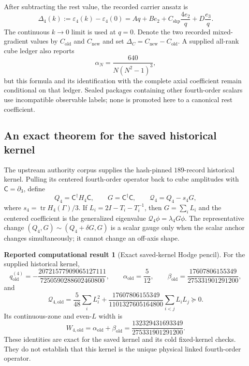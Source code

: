 \documentclass[11pt]{article}
\theoremstyle{plain}
\theoremstyle{definition}
\newtheorem{reported}[theorem]{Reported computational result}
\theoremstyle{remark}
\newcommand{\dg}{^{\dagger}}
\begin{document}
After subtracting the rest value, the recorded carrier ansatz is
\begin{equation}\label{eq:shapeansatz}
 \Delta_4(k):=\varepsilon_4(k)-\varepsilon_4(0)
 =Aq+Be_2+C_{\mathrm{shp}}\frac{4e_2}{q}
   +D\frac{e_3}{q}.
\end{equation}
The continuous $k\to0$ limit is used at $q=0$. Denote the two recorded
mixed-gradient values by $C_{\mathrm{old}}$ and $C_{\mathrm{new}}$ and set
$\Delta_C=C_{\mathrm{new}}-C_{\mathrm{old}}$. A supplied all-rank cube ledger
also reports
\begin{equation}\label{eq:alphaN}
 \alpha_N=\frac{640}{N(N^2-1)^3},
\end{equation}
but this formula and its identification with the complete axial coefficient
remain conditional on that ledger. Sealed packages containing other
fourth-order scalars use incompatible observable labels; none is promoted here
to a canonical rest coefficient.

\subsection{An exact theorem for the saved historical kernel}

The upstream authority corpus supplies the hash-pinned $189$-record historical
kernel. Pulling its centered fourth-order operator back to cube amplitudes with
$\mathsf C=\partial_3$, define
\[
 Q_4=\mathsf C\dg H_4\mathsf C,
 \qquad G=\mathsf C\dg\mathsf C,
 \qquad \mathcal Q_4=Q_4-s_4G,
\]
where $s_4=\operatorname{tr}H_4(\Gamma)/3$. If
$L_i=2I-T_i-T_i^{-1}$, then $G=\sum_iL_i$ and the centered coefficient is the
generalized eigenvalue $\mathcal Q_4\phi=\lambda_4G\phi$. The representative
change $(Q_4,G)\sim(Q_4+\delta G,G)$ is a scalar gauge only when the scalar
anchor changes simultaneously; it cannot change an off-axis shape.

\begin{reported}[Exact saved-kernel Hodge pencil]\label{rep:historical}
For the supplied historical kernel,
\[
 q_{\mathrm{old}}^{(4)}
 =-\frac{20721577909065127111}{7250590288602460800},\qquad
 \alpha_{\mathrm{old}}=\frac5{12},\qquad
 \beta_{\mathrm{old}}
 =\frac{17607806155349}{275331901291200},
\]
and
\begin{equation}\label{eq:oldhodge}
 \mathcal Q_{4,\mathrm{old}}
 =\frac5{48}\sum_iL_i^2
 +\frac{17607806155349}{1101327605164800}
   \sum_{i<j}L_iL_j\succeq0.
\end{equation}
Its continuous-zone and even-$L$ width is
\[
 W_{4,\mathrm{old}}=\alpha_{\mathrm{old}}+\beta_{\mathrm{old}}
 =\frac{132329431693349}{275331901291200}.
\]
These identities are exact for the saved kernel and its cold fixed-kernel
checks. They do not establish that this kernel is the unique physical linked
fourth-order operator.
\end{reported}
\end{document}
